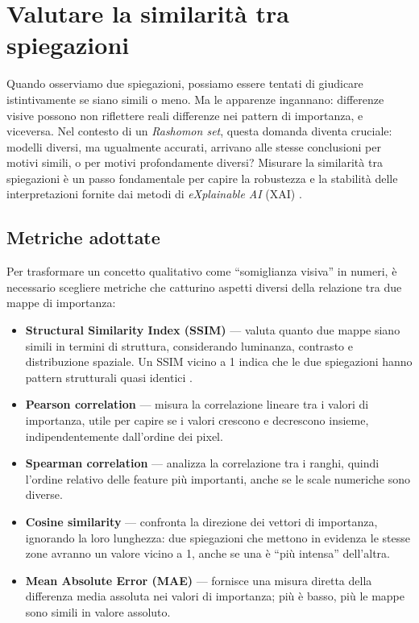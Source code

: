 \documentclass[12pt,a4paper,oneside]{report}
\numberwithin{figure}{chapter}
\numberwithin{table}{chapter}
\begin{document}
\chapter{Valutare la similarità tra spiegazioni}

Quando osserviamo due spiegazioni, possiamo essere tentati di giudicare
istintivamente se siano simili o meno. Ma le apparenze ingannano: differenze
visive possono non riflettere reali differenze nei pattern di importanza, e
viceversa. Nel contesto di un \emph{Rashomon set}, questa domanda diventa
cruciale: modelli diversi, ma ugualmente accurati, arrivano alle stesse
conclusioni per motivi simili, o per motivi profondamente diversi? Misurare la
similarità tra spiegazioni è un passo fondamentale per capire la robustezza e
la stabilità delle interpretazioni fornite dai metodi di \emph{eXplainable AI}
(XAI) \citep{samek2016evaluating, mueller2023rashomon}.

\section{Metriche adottate}
Per trasformare un concetto qualitativo come ``somiglianza visiva'' in numeri,
è necessario scegliere metriche che catturino aspetti diversi della relazione
tra due mappe di importanza:

\begin{itemize}
      \item \textbf{Structural Similarity Index (SSIM)} — valuta quanto due mappe siano simili in termini di struttura, considerando luminanza, contrasto e distribuzione spaziale. Un SSIM vicino a 1 indica che le due spiegazioni hanno pattern strutturali quasi identici \citep{wang2004ssim}.
      \item \textbf{Pearson correlation} — misura la correlazione lineare tra i valori di importanza, utile per capire se i valori crescono e decrescono insieme, indipendentemente dall’ordine dei pixel.
      \item \textbf{Spearman correlation} — analizza la correlazione tra i ranghi, quindi l’ordine relativo delle feature più importanti, anche se le scale numeriche sono diverse.
      \item \textbf{Cosine similarity} — confronta la direzione dei vettori di importanza, ignorando la loro lunghezza: due spiegazioni che mettono in evidenza le stesse zone avranno un valore vicino a 1, anche se una è ``più intensa'' dell’altra.
      \item \textbf{Mean Absolute Error (MAE)} — fornisce una misura diretta della differenza media assoluta nei valori di importanza; più è basso, più le mappe sono simili in valore assoluto.
\end{itemize}
\end{document}
